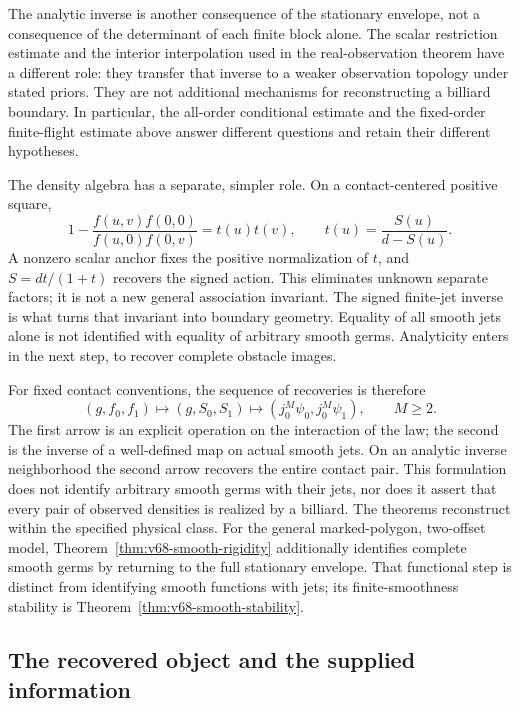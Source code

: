 The analytic inverse is another consequence of the stationary envelope,
not a consequence of the determinant of each finite block alone.
The scalar restriction estimate and the interior interpolation used in
the real-observation theorem have a different role: they transfer that
inverse to a weaker observation topology under stated priors.  They are
not additional mechanisms for reconstructing a billiard boundary.
In particular, the all-order conditional estimate and the fixed-order
finite-flight estimate above answer different questions and retain their
different hypotheses.

The density algebra has a separate, simpler role.  On a contact-centered
positive square,
\[
 1-\frac{f(u,v)f(0,0)}{f(u,0)f(0,v)}=t(u)t(v),
 \qquad t(u)=\frac{S(u)}{d-S(u)}.
\]
A nonzero scalar anchor fixes the positive normalization of $t$, and
$S=dt/(1+t)$ recovers the signed action.  This eliminates unknown
separate factors; it is not a new general association invariant.
The signed finite-jet inverse is what turns that invariant into
boundary geometry.  Equality of all smooth jets alone is not identified
with equality of arbitrary smooth germs.  Analyticity enters in the
next step, to recover complete obstacle images.


For fixed contact conventions, the sequence of recoveries is therefore
\[
 (g,f_0,f_1)\longmapsto(g,S_0,S_1)
       \longmapsto (j_0^M\psi_0,j_0^M\psi_1),\qquad M\ge2.
\]
The first arrow is an explicit operation on the interaction of the law;
the second is the inverse of a well-defined map on actual smooth jets.
On an analytic inverse neighborhood the second arrow recovers the entire
contact pair.  This formulation does not identify arbitrary smooth germs
with their jets, nor does it assert that every pair of observed densities
is realized by a billiard.  The theorems reconstruct within the specified
physical class.  For the general marked-polygon, two-offset model,
Theorem~\ref{thm:v68-smooth-rigidity} additionally identifies complete
smooth germs by returning to the full stationary envelope.  That
functional step is distinct from identifying smooth functions with jets;
its finite-smoothness stability is Theorem~\ref{thm:v68-smooth-stability}.



\subsection{The recovered object and the supplied information}


